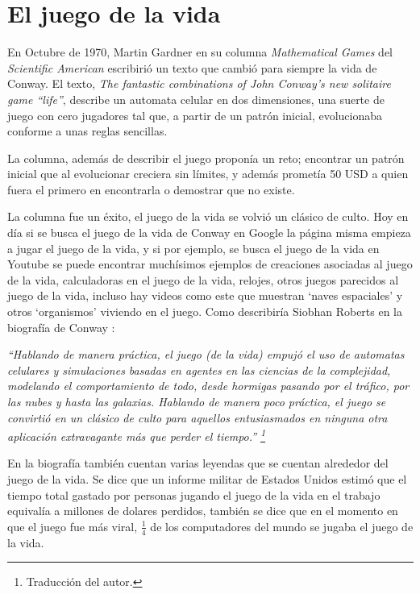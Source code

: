 \section{El juego de la vida}

En Octubre de 1970, Martin Gardner en su columna \textit{Mathematical Games} del \textit{Scientific American} \cite{Gardner1970} escribiri\'o un texto que cambi\'o para siempre la vida de Conway. El texto, \textit{The fantastic combinations of John Conway's new solitaire game ``life''}, describe un automata celular en dos dimensiones, una suerte de juego con cero jugadores tal que, a partir de un patr\'on inicial, evolucionaba conforme a unas reglas sencillas.

La columna, adem\'as de describir el juego propon\'ia un reto; encontrar un patr\'on inicial que al evolucionar creciera sin l\'imites, y adem\'as promet\'ia 50 USD a quien fuera el primero en encontrarla o demostrar que no existe.

La columna fue un \'exito, el juego de la vida se volvi\'o un cl\'asico de culto. Hoy en d\'ia si se busca el juego de la vida de Conway en Google la p\'agina misma empieza a jugar el juego de la vida, y si por ejemplo, se busca el juego de la vida en Youtube se puede encontrar much\'isimos ejemplos de creaciones asociadas al juego de la vida, calculadoras en el juego de la vida, relojes, otros juegos parecidos al juego de la vida, incluso hay videos como este \cite{YTEpicLife} que muestran `naves espaciales' y otros `organismos' viviendo en el juego. Como describir\'ia Siobhan Roberts en la biograf\'ia de Conway \cite{Roberts2015-ur}:

\textit{``Hablando de manera pr\'actica, el juego (de la vida) empuj\'o el uso de automatas celulares y simulaciones basadas en agentes en las ciencias de la complejidad, modelando el comportamiento de todo, desde hormigas pasando por el tr\'afico, por las nubes y hasta las galaxias. Hablando de manera poco pr\'actica, el juego se convirti\'o en un cl\'asico de culto para aquellos entusiasmados en ninguna otra aplicaci\'on extravagante m\'as que perder el tiempo.'' \footnote{Traducci\'on del autor.}}

En la biograf\'ia tambi\'en cuentan varias leyendas que se cuentan alrededor del juego de la vida. Se dice que un informe militar de Estados Unidos estim\'o que el tiempo total gastado por personas jugando el juego de la vida en el trabajo equival\'ia a millones de dolares perdidos, tambi\'en se dice que en el momento en que el juego fue m\'as viral, $\frac{1}{4}$ de los computadores del mundo se jugaba el juego de la vida.

